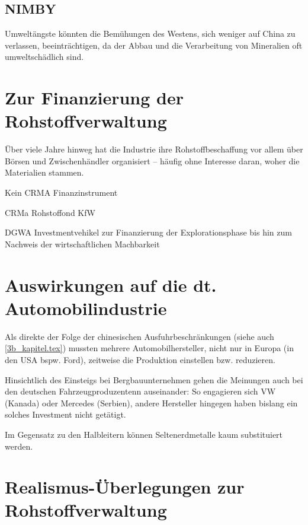 \documentclass[12pt,a4paper,oneside]{book} %
\begin{document}
\subsection{NIMBY}

Umweltängste könnten die Bemühungen des Westens, sich weniger auf China zu verlassen, beeinträchtigen, da der Abbau und die Verarbeitung von Mineralien oft umweltschädlich sind.

\section{Zur Finanzierung der Rohstoffverwaltung}

Über viele Jahre hinweg hat die Industrie ihre Rohstoffbeschaffung vor allem über Börsen und Zwischenhändler organisiert – häufig ohne Interesse daran, woher die Materialien stammen.\autocite{https://www.africa-business-guide.de/de/praxis/erfahrungen/schluesselrolle-afrikas-bedeutung-bei-den-kritischen-rohstoffen--1920084}

Kein CRMA Finanzinstrument

CRMa Rohstoffond KfW

DGWA Investmentvehikel zur Finanzierung der Explorationsphase bis hin zum Nachweis der wirtschaftlichen Machbarkeit

\section{Auswirkungen auf die dt. Automobilindustrie}



Als direkte der Folge der chinesischen Ausfuhrbeschränkungen (siehe auch \ref{3b_kapitel.tex}) mussten mehrere Automobilhersteller, nicht nur in Europa (in den USA bspw. Ford\autocite{Naughton_Bloomberg}), zeitweise die Produktion einstellen bzw. reduzieren.

Hinsichtlich des Einsteigs bei Bergbauunternehmen gehen die Meinungen auch bei den deutschen Fahrzeugproduzentenn auseinander: So engagieren sich VW (Kanada) oder Mercedes (Serbien), andere Hersteller hingegen haben bislang ein solches Investment nicht getätigt.

Im Gegensatz zu den Halbleitern können Seltenerdmetalle kaum substituiert werden.

\section{Realismus-Überlegungen zur Rohstoffverwaltung}
\end{document}
